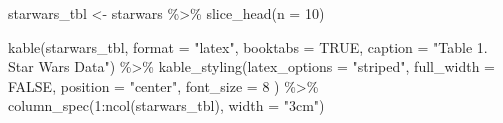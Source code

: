 \documentclass[
  man,
  floatsintext,
  longtable,
  nolmodern,
  notxfonts,
  notimes,
  colorlinks=true,linkcolor=blue,citecolor=blue,urlcolor=blue]{apa7}
\newenvironment{Shaded}{\begin{snugshade}}{\end{snugshade}}
\newcommand{\AttributeTok}[1]{\textcolor[rgb]{0.40,0.45,0.13}{#1}}
\newcommand{\ConstantTok}[1]{\textcolor[rgb]{0.56,0.35,0.01}{#1}}
\newcommand{\DecValTok}[1]{\textcolor[rgb]{0.68,0.00,0.00}{#1}}
\newcommand{\FunctionTok}[1]{\textcolor[rgb]{0.28,0.35,0.67}{#1}}
\newcommand{\NormalTok}[1]{\textcolor[rgb]{0.00,0.23,0.31}{#1}}
\newcommand{\OtherTok}[1]{\textcolor[rgb]{0.00,0.23,0.31}{#1}}
\newcommand{\SpecialCharTok}[1]{\textcolor[rgb]{0.37,0.37,0.37}{#1}}
\newcommand{\StringTok}[1]{\textcolor[rgb]{0.13,0.47,0.30}{#1}}
\begin{document}
\begin{Shaded}
\begin{Highlighting}[]
\NormalTok{starwars\_tbl }\OtherTok{\textless{}{-}}\NormalTok{ starwars }\SpecialCharTok{\%\textgreater{}\%}
  \FunctionTok{slice\_head}\NormalTok{(}\AttributeTok{n =} \DecValTok{10}\NormalTok{)}

\FunctionTok{kable}\NormalTok{(starwars\_tbl, }\AttributeTok{format =} \StringTok{"latex"}\NormalTok{, }\AttributeTok{booktabs =} \ConstantTok{TRUE}\NormalTok{, }\AttributeTok{caption =} \StringTok{"Table 1. Star Wars Data"}\NormalTok{) }\SpecialCharTok{\%\textgreater{}\%}
  \FunctionTok{kable\_styling}\NormalTok{(}\AttributeTok{latex\_options =} \StringTok{"striped"}\NormalTok{, }\AttributeTok{full\_width =} \ConstantTok{FALSE}\NormalTok{,}
  \AttributeTok{position =} \StringTok{"center"}\NormalTok{,}
  \AttributeTok{font\_size =} \DecValTok{8}
\NormalTok{) }\SpecialCharTok{\%\textgreater{}\%}
\FunctionTok{column\_spec}\NormalTok{(}\DecValTok{1}\SpecialCharTok{:}\FunctionTok{ncol}\NormalTok{(starwars\_tbl), }\AttributeTok{width =} \StringTok{"3cm"}\NormalTok{)}
\end{Highlighting}
\end{Shaded}
\end{document}
